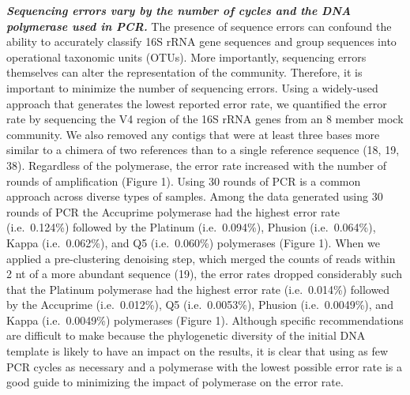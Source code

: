 \documentclass[11pt,]{article}
\begin{document}
\textbf{\emph{Sequencing errors vary by the number of cycles and the DNA
polymerase used in PCR.}} The presence of sequence errors can confound
the ability to accurately classify 16S rRNA gene sequences and group
sequences into operational taxonomic units (OTUs). More importantly,
sequencing errors themselves can alter the representation of the
community. Therefore, it is important to minimize the number of
sequencing errors. Using a widely-used approach that generates the
lowest reported error rate, we quantified the error rate by sequencing
the V4 region of the 16S rRNA genes from an 8 member mock community. We
also removed any contigs that were at least three bases more similar to
a chimera of two references than to a single reference sequence (18, 19,
38). Regardless of the polymerase, the error rate increased with the
number of rounds of amplification (Figure 1). Using 30 rounds of PCR is
a common approach across diverse types of samples. Among the data
generated using 30 rounds of PCR the Accuprime polymerase had the
highest error rate (i.e.~0.124\%) followed by the Platinum
(i.e.~0.094\%), Phusion (i.e.~0.064\%), Kappa (i.e.~0.062\%), and Q5
(i.e.~0.060\%) polymerases (Figure 1). When we applied a pre-clustering
denoising step, which merged the counts of reads within 2 nt of a more
abundant sequence (19), the error rates dropped considerably such that
the Platinum polymerase had the highest error rate (i.e.~0.014\%)
followed by the Accuprime (i.e.~0.012\%), Q5 (i.e.~0.0053\%), Phusion
(i.e.~0.0049\%), and Kappa (i.e.~0.0049\%) polymerases (Figure 1).
Although specific recommendations are difficult to make because the
phylogenetic diversity of the initial DNA template is likely to have an
impact on the results, it is clear that using as few PCR cycles as
necessary and a polymerase with the lowest possible error rate is a good
guide to minimizing the impact of polymerase on the error rate.
\end{document}
